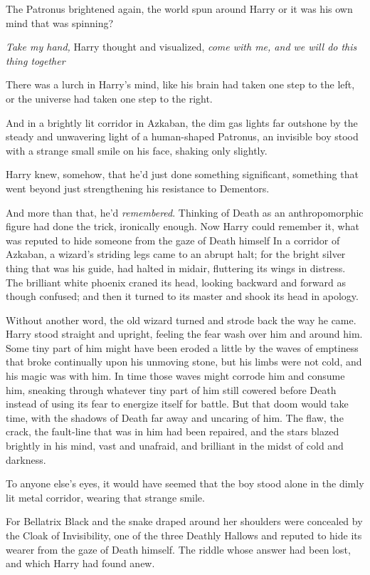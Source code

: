 The Patronus brightened again, the world spun around Harry or it was his own
mind that was spinning?

\emph{Take my hand,} Harry thought and visualized, \emph{come with me, and we
will do this thing together{\el}}

There was a lurch in Harry's mind, like his brain had taken one step to the
left, or the universe had taken one step to the right.

And in a brightly lit corridor in Azkaban, the dim gas lights far outshone by
the steady and unwavering light of a human-shaped Patronus, an invisible boy
stood with a strange small smile on his face, shaking only slightly.

Harry knew, somehow, that he'd just done something significant, something that
went beyond just strengthening his resistance to Dementors.

And more than that, he'd \emph{remembered}. Thinking of Death as an
anthropomorphic figure had done the trick, ironically enough. Now Harry could
remember it, what was reputed to hide someone from the gaze of Death
himself{\el}
\sbreak
In a corridor of Azkaban, a wizard's striding legs came to an abrupt halt; for
the bright silver thing that was his guide, had halted in midair, fluttering
its wings in distress. The brilliant white phoenix craned its head, looking
backward and forward as though confused; and then it turned to its master and
shook its head in apology.

Without another word, the old wizard turned and strode back the way he came.
\sbreak
Harry stood straight and upright, feeling the fear wash over him and around
him. Some tiny part of him might have been eroded a little by the waves of
emptiness that broke continually upon his unmoving stone, but his limbs were
not cold, and his magic was with him. In time those waves might corrode him and
consume him, sneaking through whatever tiny part of him still cowered before
Death instead of using its fear to energize itself for battle. But that doom
would take time, with the shadows of Death far away and uncaring of him. The
flaw, the crack, the fault-line that was in him had been repaired, and the
stars blazed brightly in his mind, vast and unafraid, and brilliant in the
midst of cold and darkness.

To anyone else's eyes, it would have seemed that the boy stood alone in the
dimly lit metal corridor, wearing that strange smile.

For Bellatrix Black and the snake draped around her shoulders were concealed by
the Cloak of Invisibility, one of the three Deathly Hallows and reputed to hide
its wearer from the gaze of Death himself. The riddle whose answer had been
lost, and which Harry had found anew.

